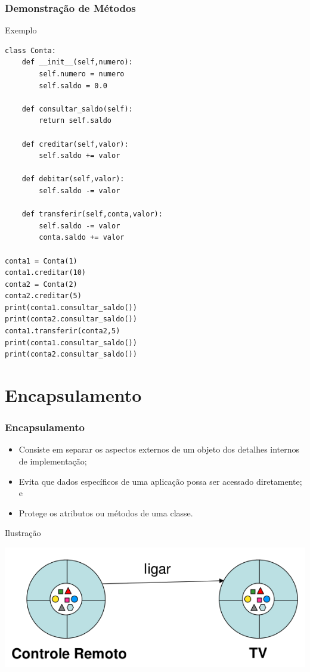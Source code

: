 \documentclass{beamer}
\begin{document}
\begin{frame}[fragile]
	\frametitle{Demonstração de Métodos}
	
	\begin{exampleblock}{Exemplo}
		\begin{lstlisting}
class Conta:
    def __init__(self,numero):
        self.numero = numero
        self.saldo = 0.0

    def consultar_saldo(self):
        return self.saldo

    def creditar(self,valor):
        self.saldo += valor

    def debitar(self,valor):
        self.saldo -= valor

    def transferir(self,conta,valor):
        self.saldo -= valor
        conta.saldo += valor

conta1 = Conta(1)
conta1.creditar(10)
conta2 = Conta(2)
conta2.creditar(5)
print(conta1.consultar_saldo())
print(conta2.consultar_saldo())
conta1.transferir(conta2,5)
print(conta1.consultar_saldo())
print(conta2.consultar_saldo())
		\end{lstlisting}
	\end{exampleblock}
\end{frame}

\section{Encapsulamento}

\begin{frame}
	\frametitle{Encapsulamento}
	
	\begin{itemize}
	  \item Consiste em separar os aspectos externos de um objeto dos detalhes
	  internos de implementação;
	  \item Evita que dados específicos de uma aplicação possa ser acessado
	  diretamente; e
	  \item Protege os atributos ou métodos de uma classe.
	\end{itemize} \vfill
	
	\begin{exampleblock}{Ilustração}
		\begin{center}
			\includegraphics[scale=0.3]{./imagens/encapsulamento}
		\end{center}		
	\end{exampleblock}
\end{frame}
\end{document}
